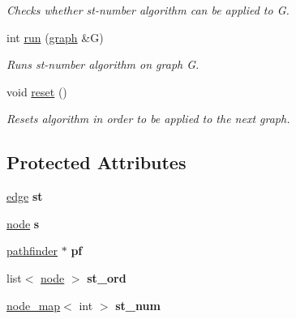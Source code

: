 \begin{DoxyCompactItemize}
\begin{DoxyCompactList}\small\item\em Checks whether st-\/number algorithm can be applied to {\ttfamily G}. \end{DoxyCompactList}\item 
int \mbox{\hyperlink{classst__number_af902a0c05d07d47b587e8f7a6b7beaa1}{run}} (\mbox{\hyperlink{classgraph}{graph}} \&G)
\begin{DoxyCompactList}\small\item\em Runs st-\/number algorithm on graph {\ttfamily G}. \end{DoxyCompactList}\item 
void \mbox{\hyperlink{classst__number_ae6f86706b8ae3495d3794b8c684fff0f}{reset}} ()
\begin{DoxyCompactList}\small\item\em Resets algorithm in order to be applied to the next graph. \end{DoxyCompactList}\end{DoxyCompactItemize}
\subsection*{Protected Attributes}
\begin{DoxyCompactItemize}
\item 
\mbox{\label{classst__number_a58fe3a128f0d06ce17742b62d8eff1a8}} 
\mbox{\hyperlink{classedge}{edge}} {\bfseries st}
\item 
\mbox{\label{classst__number_a1ada73c04f88b70b2392aa9ab0d1a6b0}} 
\mbox{\hyperlink{classnode}{node}} {\bfseries s}
\item 
\mbox{\label{classst__number_a2aa9c83b684379d86c4e620f0a3e5703}} 
\mbox{\hyperlink{classpathfinder}{pathfinder}} $\ast$ {\bfseries pf}
\item 
\mbox{\label{classst__number_a01e08e56e7251800233b16eb6140c156}} 
list$<$ \mbox{\hyperlink{classnode}{node}} $>$ {\bfseries st\+\_\+ord}
\item 
\mbox{\label{classst__number_ac3443aa6c9d11b990357d8ac1342cabc}} 
\mbox{\hyperlink{classnode__map}{node\+\_\+map}}$<$ int $>$ {\bfseries st\+\_\+num}
\end{DoxyCompactItemize}


